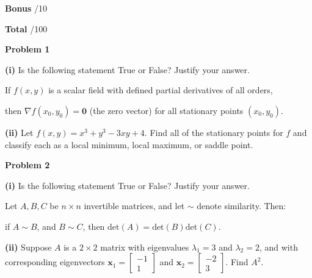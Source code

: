 \documentclass[12pt]{amsbook}
\begin{document}
\vspace{.25cm}

\textbf{Bonus} \;\hspace{.9cm} \underline{\hspace{.75cm}}/10

\vspace{.25cm}

\textbf{Total} \;\hspace{1.1cm} \underline{\hspace{.75cm}}/100










\newpage

\textbf{Problem 1}

\vspace{.25cm}

\textbf{(i)} Is the following statement True or False? Justify your answer.
\begin{center}
If $f(x,y)$ is a scalar field with defined partial derivatives of all orders, 

then $\nabla f(x_0,y_0) = \textbf{0}$ (the zero vector) for all stationary points $(x_0,y_0)$.
\end{center}

\vspace{5cm}

\textbf{(ii)} Let $f(x,y) = x^3+y^3-3xy + 4$. Find all of the stationary points for $f$ and classify each as a local minimum, local maximum, or saddle point.








\newpage

\textbf{Problem 2}

\vspace{.25cm}

\textbf{(i)} Is the following statement True or False? Justify your answer.
\begin{center}
Let $A,B,C$ be $n\times n$ invertible matrices, and let $\sim$ denote similarity. Then:

if $A\sim B$, and $B\sim C$, then $\text{det}(A) = \text{det}(B)\text{det}(C)$.
\end{center}

\vspace{5cm}


\textbf{(ii)} Suppose $A$ is a $2\times 2$ matrix with eigenvalues $\lambda_1 = 3$ and $\lambda_2 = 2$, and with corresponding eigenvectors $\textbf{x}_1 = \left[\begin{array}{c} -1 \\ 1\end{array}\right]$ and $\textbf{x}_2 = \left[\begin{array}{c} -2 \\ 3 \end{array}\right]$. Find $A^2$.
\end{document}
